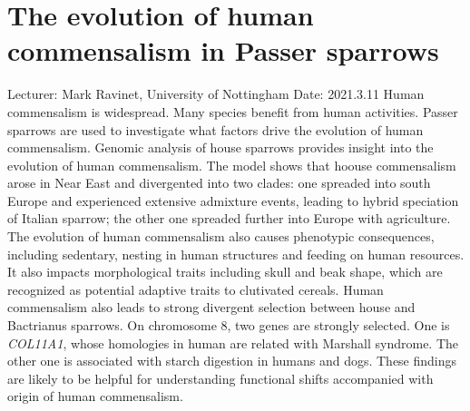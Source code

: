 \documentclass[11pt]{article}
\begin{document}
  \section{The evolution of human commensalism in Passer sparrows}
  Lecturer: Mark Ravinet, University of Nottingham
  \newline
  Date: 2021.3.11
  \newline
  Human commensalism is widespread. Many species benefit from human activities. 
  Passer sparrows are used to investigate what factors drive the evolution of human commensalism. 
  \newline
  Genomic analysis of house sparrows provides insight into the evolution of human commensalism. 
  The model shows that hoouse commensalism arose in Near East and divergented into two clades: one spreaded into south Europe and experienced extensive admixture events, leading to hybrid speciation of Italian sparrow; the other one spreaded further into Europe with agriculture. 
  \newline
  The evolution of human commensalism also causes phenotypic consequences, including sedentary, nesting in human structures and feeding on human resources. 
  It also impacts morphological traits including skull and beak shape, which are recognized as potential adaptive traits to clutivated cereals. 
  \newline 
  Human commensalism also leads to strong divergent selection between house and Bactrianus sparrows. 
  On chromosome 8, two genes are strongly selected. 
  One is \textit{COL11A1}, whose homologies in human are related with Marshall syndrome. 
  The other one is associated with starch digestion in humans and dogs. 
  These findings are likely to be helpful for understanding functional shifts accompanied with origin of human commensalism.

  \newpage
\end{document}
